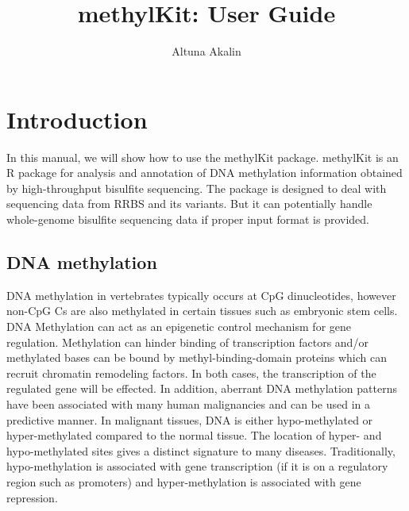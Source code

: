 \documentclass{article}
\title{ methylKit: User Guide}
\author{Altuna Akalin}
\begin{document}


% 





\maketitle

\tableofcontents


\section{Introduction}
In this manual, we will show how to use the methylKit package. methylKit is an R package for analysis and annotation of DNA methylation information obtained by high-throughput bisulfite sequencing. The package is designed to deal with sequencing data from RRBS and its variants. But it can potentially handle whole-genome bisulfite sequencing data if proper input format is provided. 

\subsection{DNA methylation}
DNA methylation in vertebrates typically occurs at CpG dinucleotides, however non-CpG Cs are also methylated in certain tissues such as embryonic stem cells. DNA Methylation can act as an epigenetic control mechanism for gene regulation. Methylation can hinder binding of transcription factors and/or methylated bases can be bound by methyl-binding-domain proteins which can recruit chromatin remodeling factors. In both cases, the transcription of the regulated gene will be effected. In addition, aberrant DNA methylation patterns have been associated with many human malignancies and can be used in a predictive manner. In malignant tissues, DNA is either hypo-methylated or hyper-methylated compared to the normal tissue. The location of hyper- and hypo-methylated sites gives a distinct signature to many diseases. Traditionally, hypo-methylation is associated with gene transcription (if it is on a regulatory region such as promoters) and hyper-methylation is associated with gene repression.
\end{document}
